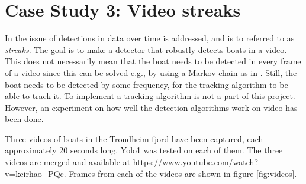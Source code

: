 \newpage

\section{Case Study 3: Video streaks}
In \citep{Bohn2018} the issue of detections in data over time is addressed, and is to referred to as \textit{streaks}. The goal is to make a detector that robustly detects boats in a video. This does not necessarily mean that the boat needs to be detected in every frame of a video since this can be solved e.g., by using a Markov chain as in \citep{Markov}. Still, the boat needs to be detected by some frequency, for the tracking algorithm to be able to track it. To implement a tracking algorithm is not a part of this project. However, an experiment on how well the detection algorithms work on video has been done. 

\vspace{3mm}

Three videos of boats in the Trondheim fjord have been captured, each approximately 20 seconds long. Yolo1 was tested on each of them. The three videos are merged and available at \url{https://www.youtube.com/watch?v=kcirhao_PQc}. Frames from each of the videos are shown in figure \ref{fig:videos}.

